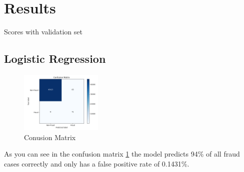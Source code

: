 \documentclass[a4, 10 pt, conference]{ieeeconf}  %
\begin{document}
\section{Results}
\label{sec:results}



Scores with validation set
\begin{center}
  \begin{table}[!h]

  \end{table}
\end{center}


\subsection{Logistic Regression}
\begin{figure}[H]
  \centering
  \includegraphics[width=0.35\textwidth]{images/confusion_matrix.png}
  \caption{Conusion Matrix}
  \label{fig:lr-confusion}
\end{figure}
As you can see in the confusion matrix \ref{fig:lr-confusion} the model predicts 94\% of all fraud cases correctly and only has a false positive rate of 0.1431\%.
\end{document}
